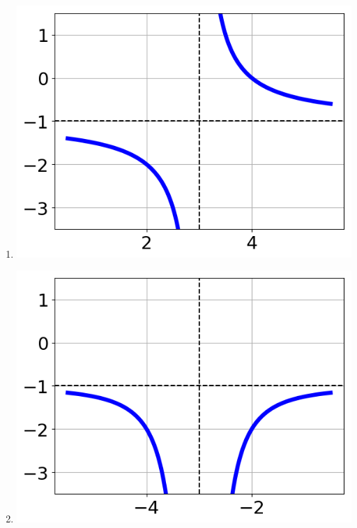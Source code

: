 \documentclass{article}[10pt]
\begin{document}
\begin{enumerate}[label=\Alph*.]
\item  
\begin{center}\includegraphics[scale=0.5]{../Figures/question35AC.png}\end{center} 
 
\item  
\begin{center}\includegraphics[scale=0.5]{../Figures/question35AD.png}\end{center} 
 

\end{enumerate}
\end{document}
